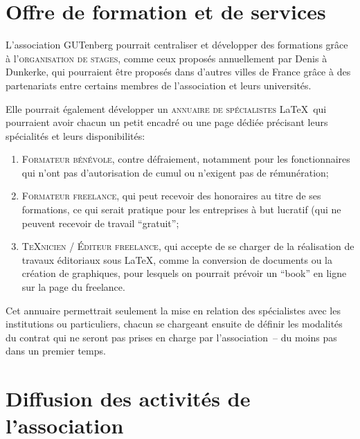 \documentclass{tufte-handout}
\newcommand{\ratio}[3][]{\marginpar{\footnotesize{\textcolor{teal}{Temps requis: #2 / Utilité: #3}\par\noindent \textcolor{teal}{#1}}}}
\begin{document}
\section{Offre de formation et de services}

L'association GUTenberg\ratio[Chronophage, mais utile et potentiellement rémunéré]{+++}{+++} pourrait centraliser et développer des formations grâce à l'\textsc{organisation de stages}, comme ceux proposés annuellement par Denis  à Dunkerke, qui pourraient être proposés dans d'autres villes de France grâce à des partenariats entre certains membres de l'association et leurs universités.

Elle pourrait également\ratio[Gestion par les intéressés, autorisés par les administrateurs du site web]{+}{++} développer un \textsc{annuaire de spécialistes} \LaTeX\ qui pourraient avoir chacun un petit encadré ou une page dédiée précisant leurs spécialités et leurs disponibilités:
\begin{enumerate}
	\item\textsc{Formateur bénévole}, contre défraiement, notamment pour les fonctionnaires qui n'ont pas d'autorisation de cumul ou n'exigent pas de rémunération;
	\item\textsc{Formateur freelance}, qui peut recevoir des honoraires au titre de ses formations, ce qui serait pratique pour les entreprises à but lucratif (qui ne peuvent recevoir de travail \enquote{gratuit};
	\item\textsc{\TeX nicien / Éditeur freelance}, qui accepte de se charger de la réalisation de travaux éditoriaux sous \LaTeX, comme la conversion de documents ou la création de graphiques, pour lesquels on pourrait prévoir un \enquote{book} en ligne sur la page du freelance.
\end{enumerate}

Cet annuaire permettrait seulement la mise en relation des spécialistes avec les institutions ou particuliers, chacun se chargeant ensuite de définir les modalités du contrat qui ne seront pas prises en charge par l'association~-- du moins pas dans un premier temps.


\section{Diffusion des activités de l'association}
\end{document}
